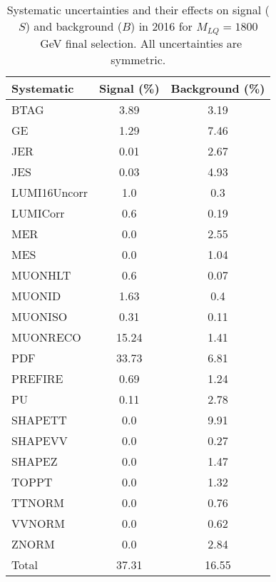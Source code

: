 \begin{table}[htbp]
\begin{center}
\caption{Systematic uncertainties and their effects on signal ($S$) and background ($B$) in 2016 for $M_{LQ}=1800$~GeV final selection. All uncertainties are symmetric.}
\begin{tabular}{lcc}
\hline\hline
Systematic & Signal (\%) & Background (\%) \\ \hline 
BTAG & 3.89 & 3.19\\ 
GE & 1.29 & 7.46\\ 
JER & 0.01 & 2.67\\ 
JES & 0.03 & 4.93\\ 
LUMI16Uncorr & 1.0 & 0.3\\ 
LUMICorr & 0.6 & 0.19\\ 
MER & 0.0 & 2.55\\ 
MES & 0.0 & 1.04\\ 
MUONHLT & 0.6 & 0.07\\ 
MUONID & 1.63 & 0.4\\ 
MUONISO & 0.31 & 0.11\\ 
MUONRECO & 15.24 & 1.41\\ 
PDF & 33.73 & 6.81\\ 
PREFIRE & 0.69 & 1.24\\ 
PU & 0.11 & 2.78\\ 
SHAPETT & 0.0 & 9.91\\ 
SHAPEVV & 0.0 & 0.27\\ 
SHAPEZ & 0.0 & 1.47\\ 
TOPPT & 0.0 & 1.32\\ 
TTNORM & 0.0 & 0.76\\ 
VVNORM & 0.0 & 0.62\\ 
ZNORM & 0.0 & 2.84\\ 
Total & 37.31 & 16.55\\ \hline \hline
\end{tabular}
\label{tab:SysUncertainties_uujj_1800}
\end{center}
\end{table}

